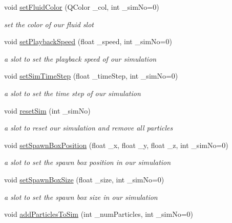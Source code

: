 \begin{DoxyCompactItemize}
void \hyperlink{class_open_g_l_widget_a559ba717c412258c234ce5865c0b6976}{set\-Fluid\-Color} (Q\-Color \-\_\-col, int \-\_\-sim\-No=0)
\begin{DoxyCompactList}\small\item\em set the color of our fluid slot \end{DoxyCompactList}\item 
void \hyperlink{class_open_g_l_widget_a3c415ea6ecc1ccf6df49b08df74bbd1a}{set\-Playback\-Speed} (float \-\_\-speed, int \-\_\-sim\-No=0)
\begin{DoxyCompactList}\small\item\em a slot to set the playback speed of our simulation \end{DoxyCompactList}\item 
void \hyperlink{class_open_g_l_widget_ac8a71d325740372032c0061d3bf1daa0}{set\-Sim\-Time\-Step} (float \-\_\-time\-Step, int \-\_\-sim\-No=0)
\begin{DoxyCompactList}\small\item\em a slot to set the time step of our simulation \end{DoxyCompactList}\item 
void \hyperlink{class_open_g_l_widget_acc54210918549bd628db0080d576b483}{reset\-Sim} (int \-\_\-sim\-No)
\begin{DoxyCompactList}\small\item\em a slot to reset our simulation and remove all particles \end{DoxyCompactList}\item 
void \hyperlink{class_open_g_l_widget_ac4d67ea702f268f7d072e94a569cb5f0}{set\-Spawn\-Box\-Position} (float \-\_\-x, float \-\_\-y, float \-\_\-z, int \-\_\-sim\-No=0)
\begin{DoxyCompactList}\small\item\em a slot to set the spawn box position in our simulation \end{DoxyCompactList}\item 
void \hyperlink{class_open_g_l_widget_a60e5e6f2845384c3faeaa11c0fb800b4}{set\-Spawn\-Box\-Size} (float \-\_\-size, int \-\_\-sim\-No=0)
\begin{DoxyCompactList}\small\item\em a slot to set the spawn box size in our simulation \end{DoxyCompactList}\item 
void \hyperlink{class_open_g_l_widget_adce23eb4fa8b5a1d1ac0403c911abb37}{add\-Particles\-To\-Sim} (int \-\_\-num\-Particles, int \-\_\-sim\-No=0)

\end{DoxyCompactItemize}

